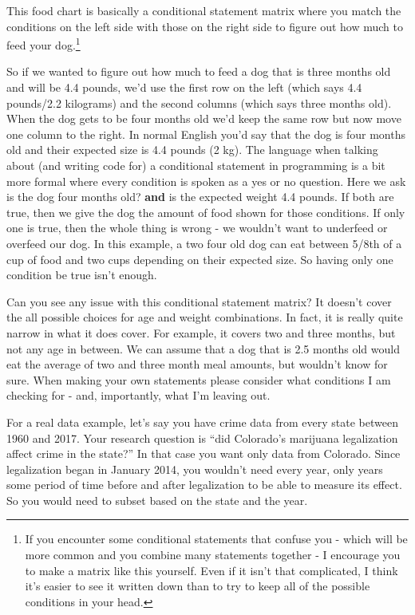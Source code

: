 \documentclass[
  12pt,
]{book}
\begin{document}
This food chart is basically a conditional statement matrix where you match the conditions on the left side with those on the right side to figure out how much to feed your dog.\footnote{If you encounter some conditional statements that confuse you - which will be more common and you combine many statements together - I encourage you to make a matrix like this yourself. Even if it isn't that complicated, I think it's easier to see it written down than to try to keep all of the possible conditions in your head.}

So if we wanted to figure out how much to feed a dog that is three months old and will be 4.4 pounds, we'd use the first row on the left (which says 4.4 pounds/2.2 kilograms) and the second columns (which says three months old). When the dog gets to be four months old we'd keep the same row but now move one column to the right. In normal English you'd say that the dog is four months old and their expected size is 4.4 pounds (2 kg). The language when talking about (and writing code for) a conditional statement in programming is a bit more formal where every condition is spoken as a yes or no question. Here we ask is the dog four months old? \textbf{and} is the expected weight 4.4 pounds. If both are true, then we give the dog the amount of food shown for those conditions. If only one is true, then the whole thing is wrong - we wouldn't want to underfeed or overfeed our dog. In this example, a two four old dog can eat between 5/8th of a cup of food and two cups depending on their expected size. So having only one condition be true isn't enough.

Can you see any issue with this conditional statement matrix? It doesn't cover the all possible choices for age and weight combinations. In fact, it is really quite narrow in what it does cover. For example, it covers two and three months, but not any age in between. We can assume that a dog that is 2.5 months old would eat the average of two and three month meal amounts, but wouldn't know for sure. When making your own statements please consider what conditions I am checking for - and, importantly, what I'm leaving out.

For a real data example, let's say you have crime data from every state between 1960 and 2017. Your research question is ``did Colorado's marijuana legalization affect crime in the state?'' In that case you want only data from Colorado. Since legalization began in January 2014, you wouldn't need every year, only years some period of time before and after legalization to be able to measure its effect. So you would need to subset based on the state and the year.
\end{document}
